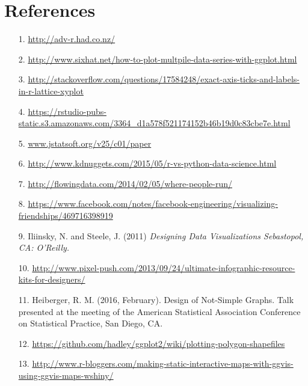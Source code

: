 
\section{References}

\begin{frame}[allowframebreaks]
  \begin{itemize}
    \item[1.] \url{http://adv-r.had.co.nz/}
    \item[2.] \url{http://www.sixhat.net/how-to-plot-multpile-data-series-with-ggplot.html}
    \item[3.] \url{http://stackoverflow.com/questions/17584248/exact-axis-ticks-and-labels-in-r-lattice-xyplot}
    \item[4.] \url{https://rstudio-pubs-static.s3.amazonaws.com/3364_d1a578f521174152b46b19d0c83cbe7e.html}
    \item[5.] \url{www.jstatsoft.org/v25/c01/paper}
    \item[6.] \url{http://www.kdnuggets.com/2015/05/r-vs-python-data-science.html}
    \item[7.] \url{http://flowingdata.com/2014/02/05/where-people-run/}
    \item[8.] \url{https://www.facebook.com/notes/facebook-engineering/visualizing-friendships/469716398919}
    \item[9.] Iliinsky, N. and Steele, J. (2011) \itshape{Designing Data Visualizations} \normalfont Sebastopol, CA: O'Reilly.
    \item[10.] \url{http://www.pixel-push.com/2013/09/24/ultimate-infographic-resource-kits-for-designers/}
    \item[11.] Heiberger, R. M. (2016, February). Design of Not-Simple Graphs. Talk presented at the 
     meeting of the American Statistical Association Conference on Statistical Practice, San Diego, CA.
     \item[12.] \url{https://github.com/hadley/ggplot2/wiki/plotting-polygon-shapefiles}
     \item[13.] \url{http://www.r-bloggers.com/making-static-interactive-maps-with-ggvis-using-ggvis-maps-wshiny/}
  \end{itemize}
\end{frame}



